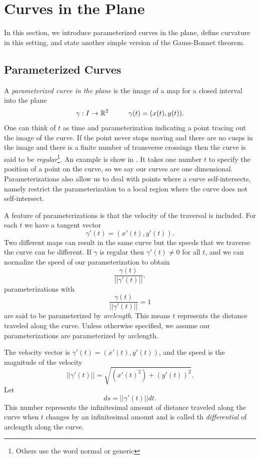 \section{Curves in the Plane}
\label{sec:curves}

In this section, we introduce parameterized curves in the plane, define curvature
in this setting, and state another simple version of the Gauss-Bonnet theorem.

\subsection{Parameterized Curves}

A \emph{parameterized curve in the plane} is the image of a map for a closed interval
into the plane
$$\gamma: I\rightarrow \mathbb{R}^2\hspace{1cm} \gamma(t)=(x(t),y(t)).$$ 
One can think of $t$ as time and parameterization indicating a point tracing out the image
of the curve.
If the point never stops moving and there are no cusps in the image and there is a finite number
of transverse crossings then the curve
is said to be \emph{regular}\footnote{Others use the word normal or generic}.
An example is show in .
It takes one number $t$ to specify the position of a point on the curve, so we say our
curves are one dimensional.
Parameterizations also allow us to deal with points where a curve self-intersects, namely 
restrict the parameterization to a local region where the curve does not self-intersect.

A feature of parameterizations is that the velocity of the traversal is included.
For each $t$ we have a tangent vector $$\gamma'(t)=(x'(t),y'(t)).$$
Two different maps can result in the same curve but the speeds that we traverse the curve can be different.
If $\gamma$ is regular then $\gamma'(t)\neq 0$ for all $t$,
and we can normalize the speed of our parameterization
to obtain $$\frac{\gamma(t)}{||\gamma'(t)||},$$ parameterizations with $$\frac{\gamma(t)}{||\gamma'(t)||}=1$$ are said to be parameterized by \emph{arclength}. This means $t$ represents 
the distance traveled along the curve. Unless otherwise specified, we assume our parameterizations are parameterized by arclength.

The velocity vector is $\gamma'(t)=(x'(t),y'(t))$, and the speed is the magnitude of the velocity
$$||\gamma'(t)||=\sqrt{(x'(t)^2)+(y'(t))^2}.$$
Let $$ds=||\gamma'(t)||dt.$$ This number represents the infinitesimal amount of distance traveled along the curve when $t$ changes by an infinitesimal amount and is called th \emph{differential} of arclength along the curve.




